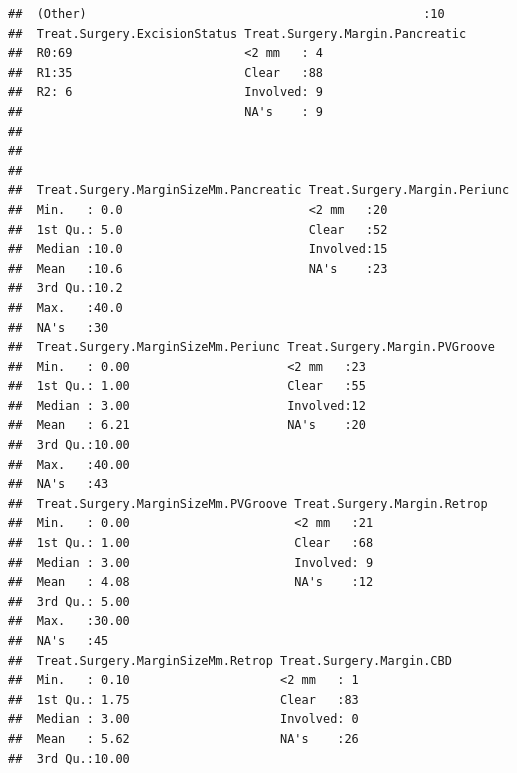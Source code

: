 \documentclass{article}
\begin{document}
\begin{knitrout}
\begin{kframe}
\begin{verbatim}
##  (Other)                                               :10        
##  Treat.Surgery.ExcisionStatus Treat.Surgery.Margin.Pancreatic
##  R0:69                        <2 mm   : 4                    
##  R1:35                        Clear   :88                    
##  R2: 6                        Involved: 9                    
##                               NA's    : 9                    
##                                                              
##                                                              
##                                                              
##  Treat.Surgery.MarginSizeMm.Pancreatic Treat.Surgery.Margin.Periunc
##  Min.   : 0.0                          <2 mm   :20                 
##  1st Qu.: 5.0                          Clear   :52                 
##  Median :10.0                          Involved:15                 
##  Mean   :10.6                          NA's    :23                 
##  3rd Qu.:10.2                                                      
##  Max.   :40.0                                                      
##  NA's   :30                                                        
##  Treat.Surgery.MarginSizeMm.Periunc Treat.Surgery.Margin.PVGroove
##  Min.   : 0.00                      <2 mm   :23                  
##  1st Qu.: 1.00                      Clear   :55                  
##  Median : 3.00                      Involved:12                  
##  Mean   : 6.21                      NA's    :20                  
##  3rd Qu.:10.00                                                   
##  Max.   :40.00                                                   
##  NA's   :43                                                      
##  Treat.Surgery.MarginSizeMm.PVGroove Treat.Surgery.Margin.Retrop
##  Min.   : 0.00                       <2 mm   :21                
##  1st Qu.: 1.00                       Clear   :68                
##  Median : 3.00                       Involved: 9                
##  Mean   : 4.08                       NA's    :12                
##  3rd Qu.: 5.00                                                  
##  Max.   :30.00                                                  
##  NA's   :45                                                     
##  Treat.Surgery.MarginSizeMm.Retrop Treat.Surgery.Margin.CBD
##  Min.   : 0.10                     <2 mm   : 1             
##  1st Qu.: 1.75                     Clear   :83             
##  Median : 3.00                     Involved: 0             
##  Mean   : 5.62                     NA's    :26             
##  3rd Qu.:10.00                                             

\end{verbatim}
\end{kframe}
\end{knitrout}
\end{document}
